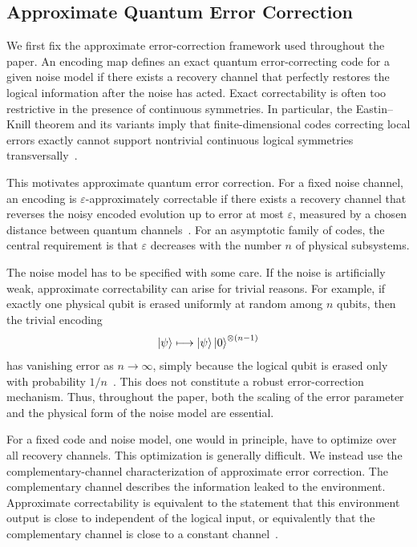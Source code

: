 \documentclass[10pt,twocolumn,superscriptaddress,aps,amsmath,amssymb,citeautoscript,floatfix,prx,longbibliography]{revtex4-2}
\theoremstyle{plain}
\theoremstyle{plain}
\theoremstyle{plain}
\theoremstyle{plain}
\theoremstyle{plain}
\theoremstyle{plain}
\begin{document}
\subsection{Approximate Quantum Error Correction}\label{subsec:main_AQEC}

We first fix the approximate error-correction framework used throughout the paper. An encoding map defines an exact quantum error-correcting code for a given noise model if there exists a recovery channel that perfectly restores the logical information after the noise has acted. Exact correctability is often too restrictive in the presence of continuous symmetries. In particular, the Eastin--Knill theorem and its variants imply that finite-dimensional codes correcting local errors exactly cannot support nontrivial continuous logical symmetries transversally~\cite{Eastin2009}.

This motivates approximate quantum error correction. For a fixed noise channel, an encoding is $\varepsilon$-approximately correctable if there exists a recovery channel that reverses the noisy encoded evolution up to error at most $\varepsilon$, measured by a chosen distance between quantum channels~\cite{Beny2010}. For an asymptotic family of codes, the central requirement is that $\varepsilon$ decreases with the number $n$ of physical subsystems.

The noise model has to be specified with some care. If the noise is artificially weak, approximate correctability can arise for trivial reasons. For example, if exactly one physical qubit is erased uniformly at random among $n$ qubits, then the trivial encoding
$$
\ket\psi
\longmapsto
\ket\psi\ket 0^{\otimes(n-1)}
$$
has vanishing error as $n\to\infty$, simply because the logical qubit is erased only with probability $1/n$~\cite{Yi2024}. This does not constitute a robust error-correction mechanism. Thus, throughout the paper, both the scaling of the error parameter and the physical form of the noise model are essential.

For a fixed code and noise model, one would in principle, have to optimize over all recovery channels. This optimization is generally difficult. We instead use the complementary-channel characterization of approximate error correction. The complementary channel describes the information leaked to the environment. Approximate correctability is equivalent to the statement that this environment output is close to independent of the logical input, or equivalently that the complementary channel is close to a constant channel~\cite{Beny2010, Faist2020}.
\end{document}
